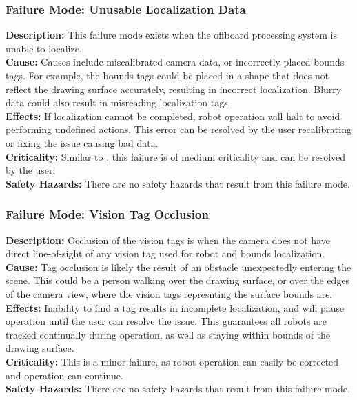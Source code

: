 \subsubsection{Failure Mode: Unusable Localization Data}
\label{sec:localization_fm_unusable}
\textbf{Description:} This failure mode exists when the offboard processing system is unable to localize. \\
\textbf{Cause:} Causes include miscalibrated camera data, or incorrectly placed bounds tags. For example, the bounds tags could be placed in a shape that does not reflect the drawing surface accurately, resulting in incorrect localization. Blurry data could also result in misreading localization tags.\\
\textbf{Effects:}  If localization cannot be completed, robot operation will halt to avoid performing undefined actions. This error can be resolved by the user recalibrating or fixing the issue causing bad data.\\
\textbf{Criticality:}  Similar to , this failure is of medium criticality and can be resolved by the user.\\
\textbf{Safety Hazards:} There are no safety hazards that result from this failure mode.\\

\subsubsection{Failure Mode: Vision Tag Occlusion}
\label{sec:localization_fm_occlusion}
\textbf{Description:} Occlusion of the vision tags is when the camera does not have direct line-of-sight of any vision tag used for robot and bounds localization.\\
\textbf{Cause:} Tag occlusion is likely the result of an obstacle unexpectedly entering the scene. This could be a person walking over the drawing surface, or over the edges of the camera view, where the vision tags represnting the surface bounds are.\\
\textbf{Effects:} Inability to find a tag results in incomplete localization, and will pause operation until the user can resolve the issue. This guarantees all robots are tracked continually during operation, as well as staying within bounds of the drawing surface. \\
\textbf{Criticality:}  This is a minor failure, as robot operation can easily be corrected and operation can continue.\\
\textbf{Safety Hazards:} There are no safety hazards that result from this failure mode.\\

